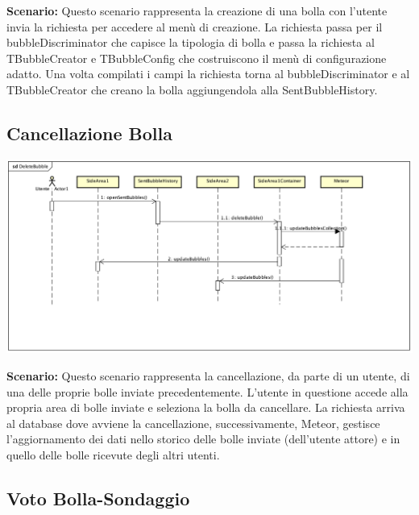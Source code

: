 \newpage

\textbf{Scenario:} 
Questo scenario rappresenta la creazione di una bolla con l’utente invia la richiesta per 	accedere al menù di creazione. La richiesta passa per il bubbleDiscriminator che capisce la 	tipologia di bolla e passa la richiesta al TBubbleCreator e TBubbleConfig che costruiscono il 	menù di configurazione adatto. 
Una volta compilati i campi la richiesta torna al bubbleDiscriminator e al TBubbleCreator che 	creano la bolla aggiungendola alla SentBubbleHistory. \\

\subsection{Cancellazione Bolla}

\begin{center}
	\includegraphics[scale=0.36]{img/DeleteBubble.png}
\end{center}



\textbf{Scenario:} 
Questo scenario rappresenta la cancellazione, da parte di un utente, di una delle proprie bolle 	inviate precedentemente. L’utente in questione accede alla propria area di bolle inviate e 	seleziona la bolla da cancellare. La richiesta arriva al database dove avviene la cancellazione, 	successivamente, Meteor, gestisce l’aggiornamento dei dati nello storico delle bolle inviate 	(dell’utente attore) e in quello delle bolle ricevute degli altri utenti. 
\newpage

\subsection{Voto Bolla-Sondaggio}

